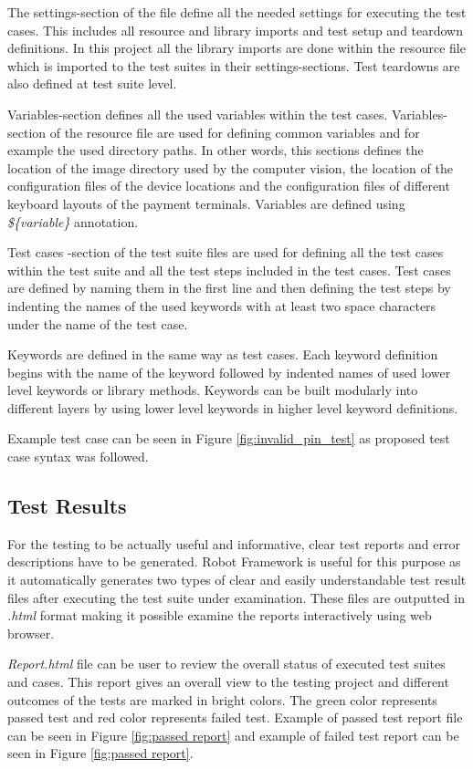 The settings-section of the file define all the needed settings for executing the test cases. This includes all resource and library imports and test setup and teardown definitions. In this project all the library imports are done within the resource file which is imported to the test suites in their settings-sections. Test teardowns are also defined at test suite level.

Variables-section defines all the used variables within the test cases. Variables-section of the resource file are used for defining common variables and for example the used directory paths. In other words, this sections defines the location of the image directory used by the computer vision, the location of the configuration files of the device locations and the configuration files of different keyboard layouts of the payment terminals. Variables are defined using \emph{\$\{variable\}} annotation.

Test cases -section of the test suite files are used for defining all the test cases within the test suite and all the test steps included in the test cases. Test cases are defined by naming them in the first line and then defining the test steps by indenting the names of the used keywords with at least two space characters under the name of the test case.
    
Keywords are defined in the same way as test cases. Each keyword definition begins with the name of the keyword followed by indented names of used lower level keywords or library methods. Keywords can be built modularly into different layers by using lower level keywords in higher level keyword definitions.

Example test case can be seen in Figure \ref{fig:invalid_pin_test} as proposed test case syntax was followed.

\subsection{Test Results}
\label{subsection:Test result syntax}

For the testing to be actually useful and informative, clear test reports and error descriptions have to be generated. Robot Framework is useful for this purpose as it automatically generates two types of clear and easily understandable test result files after executing the test suite under examination. These files are outputted in \emph{.html} format making it possible examine the reports interactively using web browser.

\emph{Report.html} file can be user to review the overall status of executed test suites and cases. This report gives an overall view to the testing project and different outcomes of the tests are marked in bright colors. The green color represents passed test and red color represents failed test. Example of passed test report file can be seen in Figure \ref{fig:passed report} and example of failed test report can be seen in Figure \ref{fig:passed report}.

